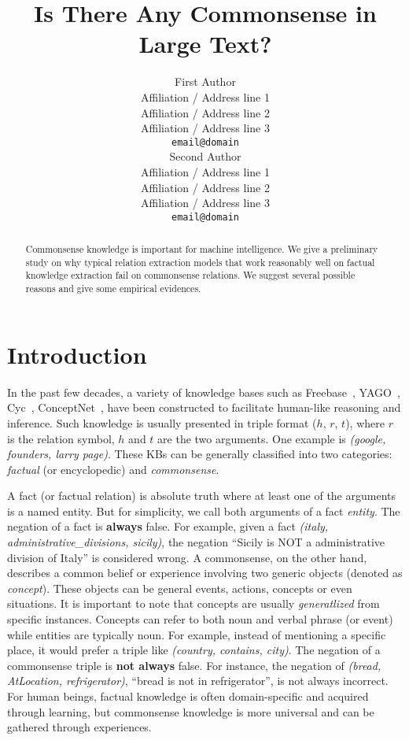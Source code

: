 \documentclass[11pt,a4paper]{article}
\title{Is There Any Commonsense in Large Text?}
\author{First Author \\
	Affiliation / Address line 1 \\
	Affiliation / Address line 2 \\
	Affiliation / Address line 3 \\
	\texttt{email@domain} \\\And
	Second Author \\
	Affiliation / Address line 1 \\
	Affiliation / Address line 2 \\
	Affiliation / Address line 3 \\
	\texttt{email@domain} \\}
\date{}
\begin{document}
	\maketitle
	\begin{abstract}
Commonsense knowledge is important for machine intelligence.
We give a preliminary study on why typical relation extraction models 
that work reasonably well on factual knowledge extraction 
fail on commonsense relations. We suggest several possible reasons
and give some empirical evidences. 
\end{abstract}
	

\section{Introduction}
\label{sec:intro}

In the past few decades, a variety of knowledge bases such as Freebase~\cite{bollacker2008freebase}, 
YAGO~\cite{suchanek2007yago}, Cyc~\cite{lenat1995cyc}, ConceptNet~\cite{speer2017conceptnet}, have been constructed to facilitate human-like
reasoning and inference. Such knowledge is usually presented in
triple format ($h$, $r$, $t$), where $r$ is the relation symbol, 
$h$ and $t$ are the two arguments. One example is 
\textit{(google, founders, larry page)}. These KBs can be 
generally classified into two categories: {\em factual} (or encyclopedic) and 
{\em commonsense}. 


A fact (or factual relation) is absolute truth where at least one of the
arguments is a named entity. But for simplicity, we call both arguments
of a fact \textit{entity}. The negation of a fact is \textbf{always} false. 
For example, given a fact \textit{(italy, administrative\_divisions, sicily)}, 
the negation ``Sicily is NOT a administrative division of Italy'' is considered
wrong.  
A commonsense, on the other hand, describes a common belief or 
experience involving two generic objects (denoted as \textit{concept}). 
These objects can be general events, actions, concepts or even situations. 
It is important to note that concepts are usually {\em generatlized} 
from specific instances.
Concepts can refer to both noun and verbal phrase (or event) while 
entities are typically noun. For example, instead of mentioning a specific place, it would prefer a triple like \textit{(country, contains, city)}. The negation of a commonsense triple is \textbf{not always} false. 
For instance, the negation of \textit{(bread, AtLocation, refrigerator)}, 
``bread is not in refrigerator'', is not always incorrect. 
For human beings, factual knowledge is often domain-specific and acquired
through learning, but commonsense knowledge is more universal and can be
gathered through experiences. 
\end{document}
